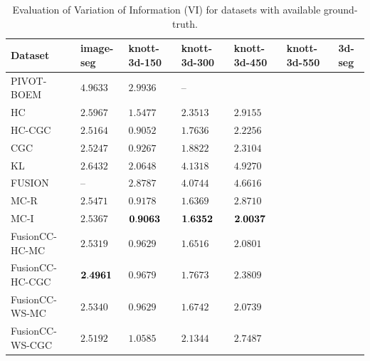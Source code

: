 \documentclass[10pt,twocolumn,letterpaper]{article}
\begin{document}
\begin{table}[H]
   \tiny
   \centering
   \caption{Evaluation of Variation of Information (VI) for datasets with available ground-truth.}
   \label{tab:eval}
   \begin{tabular}{lllllll}
      \toprule
         Dataset          &  image-seg   & knott-3d-150&knott-3d-300&knott-3d-450 &knott-3d-550 &3d-seg\\
      \midrule 
         PIVOT-BOEM       &   $ 4.9633$  &    $ 2.9936$ &       --       &\\ 
         HC               &   $ 2.5967$  &    $ 1.5477$ &    $ 2.3513$   &    $ 2.9155$ \\
         HC-CGC           &   $ 2.5164$  &    $ 0.9052$ &    $ 1.7636$   &    $ 2.2256$ \\
         CGC              &   $ 2.5247$  &    $ 0.9267$ &    $ 1.8822$   &    $ 2.3104$\\
         KL               &   $ 2.6432$  &    $ 2.0648$ &    $ 4.1318$   &    $ 4.9270$\\
         FUSION           &      --      &    $ 2.8787$ &    $ 4.0744$   &    $ 4.6616$\\
         MC-R             &   $ 2.5471$  &    $ 0.9178$ &    $ 1.6369$   &    $ 2.8710$\\   
         MC-I             &   $ 2.5367$  & $\bf 0.9063$ & $\bf 1.6352$   & $\bf 2.0037$ \\  
         FusionCC-HC-MC   &   $ 2.5319$  &    $ 0.9629$ &    $ 1.6516$   &    $ 2.0801$\\  
         FusionCC-HC-CGC  &$\bf 2.4961$  &    $ 0.9679$ &    $ 1.7673$   &    $ 2.3809$ \\  
         FusionCC-WS-MC   &   $ 2.5340$  &    $ 0.9629$ &    $ 1.6742$   &    $ 2.0739$\\  
         FusionCC-WS-CGC  &   $ 2.5192$  &    $ 1.0585$ &    $ 2.1344$   &    $ 2.7487$ \\      
      \bottomrule
   \end{tabular}
\end{table}

%
\end{document}
